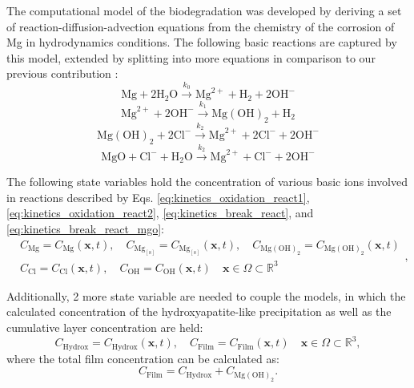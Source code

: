 The computational model of the biodegradation was developed by deriving a set of reaction-diffusion-advection equations from the chemistry of the corrosion of Mg in hydrodynamics conditions. The following basic reactions are captured by this model, extended by splitting into more equations in comparison to our previous contribution \cite{Barzegari2021}:\begin{equation} \label{eq:kinetics_oxidation_react1}
\mathrm{Mg}+2 \mathrm{H}_{2} \mathrm{O} \stackrel{k_{0}}{\rightarrow} \mathrm{Mg}^{2+}+\mathrm{H}_{2}+2 \mathrm{OH}^{-}
\end{equation}
\begin{equation} \label{eq:kinetics_oxidation_react2}
\mathrm{Mg}^{2+}+2 \mathrm{OH}^{-} \stackrel{k_{1}}{\rightarrow} \mathrm{Mg}(\mathrm{OH})_{2}+\mathrm{H}_{2}
\end{equation}
\begin{equation} \label{eq:kinetics_break_react}
\mathrm{Mg}(\mathrm{OH})_{2}+2 \mathrm{Cl}^{-} \stackrel{k_{2}}{\rightarrow} \mathrm{Mg}^{2+}+2 \mathrm{Cl}^{-}+2 \mathrm{OH}^{-}
\end{equation}
\begin{equation} \label{eq:kinetics_break_react_mgo}
\mathrm{MgO}+ \mathrm{Cl}^{-} + \mathrm{H}_{2} \mathrm{O} \stackrel{k_{2}}{\rightarrow} \mathrm{Mg}^{2+}+ \mathrm{Cl}^{-}+ 2\mathrm{OH}^{-}
\end{equation}

The following state variables hold the concentration of various basic ions involved in reactions described by Eqs. \ref{eq:kinetics_oxidation_react1}, \ref{eq:kinetics_oxidation_react2}, \ref{eq:kinetics_break_react}, and \ref{eq:kinetics_break_react_mgo}:
\begin{equation} \label{eq:kinetics_state_vars_film}
\begin{aligned}
&C_{\mathrm{Mg}} = C_{\mathrm{Mg}}(\mathbf{x},t), \quad C_{\mathrm{Mg}_\mathrm{[s]}} = C_{\mathrm{Mg}_\mathrm{[s]}}(\mathbf{x},t), \quad C_{\mathrm{Mg}(\mathrm{OH})_{2}} = C_{\mathrm{Mg}(\mathrm{OH})_{2}}(\mathbf{x},t)  \\
&C_{\mathrm{Cl}} = C_{\mathrm{Cl}}(\mathbf{x},t), \quad C_{\mathrm{OH}} = C_{\mathrm{OH}}(\mathbf{x},t) \quad \mathbf{x} \in \Omega \subset \mathbb{R}^{3}
\end{aligned},
\end{equation}

Additionally, 2 more state variable are needed to couple the models, in which the calculated concentration of the hydroxyapatite-like precipitation as well as the cumulative layer concentration are held:
\begin{equation} \label{eq:kinetics_state_vars}
C_{\mathrm{Hydrox}} = C_{\mathrm{Hydrox}}(\mathbf{x},t), \quad C_{\mathrm{Film}} = C_{\mathrm{Film}}(\mathbf{x},t) \quad \mathbf{x} \in \Omega \subset \mathbb{R}^{3},
\end{equation}
where the total film concentration can be calculated as:
\begin{equation} \label{eq:kinetics_film_cumulative}
C_{\mathrm{Film}} = C_{\mathrm{Hydrox}} + C_{\mathrm{\mathrm{Mg}(\mathrm{OH})_{2}}}.
\end{equation}

